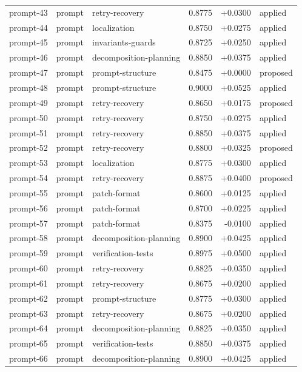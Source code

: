 \begin{center}
\begin{longtable}{llp{5.2cm}rrl}
prompt-43 & prompt & retry-recovery & 0.8775 & +0.0300 & applied \\
prompt-44 & prompt & localization & 0.8750 & +0.0275 & applied \\
prompt-45 & prompt & invariants-guards & 0.8725 & +0.0250 & applied \\
prompt-46 & prompt & decomposition-planning & 0.8850 & +0.0375 & applied \\
prompt-47 & prompt & prompt-structure & 0.8475 & +0.0000 & proposed \\
prompt-48 & prompt & prompt-structure & 0.9000 & +0.0525 & applied \\
prompt-49 & prompt & retry-recovery & 0.8650 & +0.0175 & proposed \\
prompt-50 & prompt & retry-recovery & 0.8750 & +0.0275 & applied \\
prompt-51 & prompt & retry-recovery & 0.8850 & +0.0375 & applied \\
prompt-52 & prompt & retry-recovery & 0.8800 & +0.0325 & proposed \\
prompt-53 & prompt & localization & 0.8775 & +0.0300 & applied \\
prompt-54 & prompt & retry-recovery & 0.8875 & +0.0400 & proposed \\
prompt-55 & prompt & patch-format & 0.8600 & +0.0125 & applied \\
prompt-56 & prompt & patch-format & 0.8700 & +0.0225 & applied \\
prompt-57 & prompt & patch-format & 0.8375 & -0.0100 & applied \\
prompt-58 & prompt & decomposition-planning & 0.8900 & +0.0425 & applied \\
prompt-59 & prompt & verification-tests & 0.8975 & +0.0500 & applied \\
prompt-60 & prompt & retry-recovery & 0.8825 & +0.0350 & applied \\
prompt-61 & prompt & retry-recovery & 0.8675 & +0.0200 & applied \\
prompt-62 & prompt & prompt-structure & 0.8775 & +0.0300 & applied \\
prompt-63 & prompt & retry-recovery & 0.8675 & +0.0200 & applied \\
prompt-64 & prompt & decomposition-planning & 0.8825 & +0.0350 & applied \\
prompt-65 & prompt & verification-tests & 0.8850 & +0.0375 & applied \\
prompt-66 & prompt & decomposition-planning & 0.8900 & +0.0425 & applied \\

\end{longtable}
\end{center}

